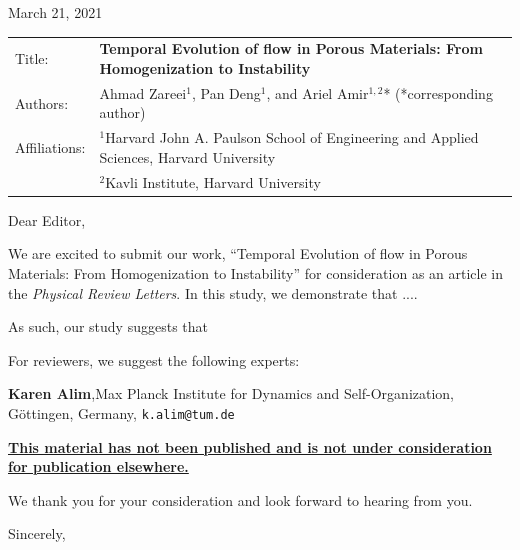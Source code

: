 \documentclass[11pt]{harvardletter}
\date{} %
\begin{document}
\begin{letter}{}

\hfill{March 21, 2021}
\vspace{20mm}


    \begin{tabular}{l l }
        \small{Title:}  & \textbf{\small{Temporal Evolution of flow in Porous Materials: From Homogenization to Instability}} \vspace{2mm} \\ 
        \small{Authors:}  & \small{Ahmad Zareei$^1$, Pan Deng$^1$, and Ariel Amir$^{1,2}$* (*corresponding author)} \vspace{2mm} \\
        \small{Affiliations:} & \small{$^1$Harvard John A. Paulson School of Engineering and Applied Sciences, Harvard University} \\
        & \small{$^2$Kavli Institute, Harvard University}
    \end{tabular}

\vspace{5mm}


\opening{Dear Editor,}

We are excited to submit our work, ``Temporal Evolution of flow in Porous Materials: From Homogenization to Instability'' for consideration as an article in the \emph{Physical Review Letters}. In this study, we demonstrate that ....



As such, our study suggests that  



For reviewers, we suggest the following experts:

\textbf{Karen Alim},Max Planck Institute for Dynamics and Self-Organization, G\"ottingen, Germany, \texttt{k.alim@tum.de}





\vspace{5mm}

\underline{\textbf{\small{This material has not been published and is not under consideration for publication elsewhere.}}}

\vspace{5mm}

We thank you for your consideration and look forward to hearing from you.


\vspace{5mm}

\closing{Sincerely,}



\end{letter}
\end{document}
